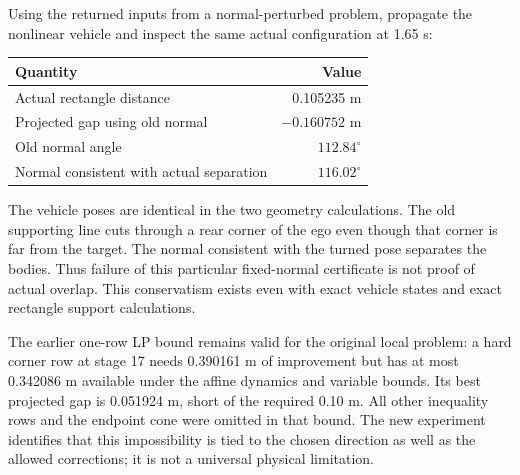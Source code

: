 \documentclass[11pt]{article}
\begin{document}
Using the returned inputs from a normal-perturbed problem, propagate the
nonlinear vehicle and inspect the same actual configuration at 1.65 s:
\begin{center}
\begin{tabular}{lr}
\toprule
Quantity & Value\\
\midrule
Actual rectangle distance & 0.105235 m\\
Projected gap using old normal & $-0.160752$ m\\
Old normal angle & $112.84^\circ$\\
Normal consistent with actual separation & $116.02^\circ$\\
\bottomrule
\end{tabular}
\end{center}
The vehicle poses are identical in the two geometry calculations. The old
supporting line cuts through a rear corner of the ego even though that corner
is far from the target. The normal consistent with the turned pose separates
the bodies. Thus failure of this particular fixed-normal certificate is not
proof of actual overlap. This conservatism exists even with exact vehicle
states and exact rectangle support calculations.

The earlier one-row LP bound remains valid for the original local problem:
a hard corner row at stage 17 needs 0.390161 m of improvement but has at most
0.342086 m available under the affine dynamics and variable bounds. Its
best projected gap is 0.051924 m, short of the required 0.10 m. All other
inequality rows and the endpoint cone were omitted in that bound. The new
experiment identifies that this impossibility is tied to the chosen direction
as well as the allowed corrections; it is not a universal physical limitation.
\end{document}
